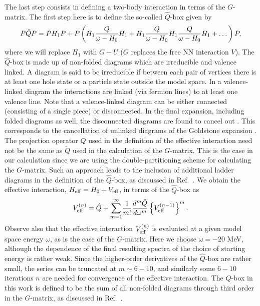 The last step consists in defining a
two-body interaction in terms of the $G$-matrix.
The first step here is to define the so-called $\hat{Q}$-box given by
\begin{equation}
   P\hat{Q}P=PH_1P+
   P\left(H_1 \frac{Q}{\omega-H_{0}}H_1\\ +H_1
   \frac{Q}{\omega-H_{0}}H_1 \frac{Q}{\omega-H_{0}}H_1 +\dots\right)P,
   \label{eq:qbox}
\end{equation}
where we will replace $H_1$ with $G-U$ ($G$ replaces the free NN interaction
$V$).
The $\hat{Q}$-box is made up of non-folded diagrams which are irreducible
and valence linked.
A diagram is said to be irreducible if between each pair
of vertices there is at least one hole state or a particle state outside
the model space. In a valence-linked diagram the interactions are linked
(via fermion lines) to at least one valence line. Note that a valence-linked
diagram can be either connected (consisting of a single piece) or
disconnected. In the final expansion, including folded diagrams as well, the
disconnected diagrams are found to cancel out \cite{ko90}.
This corresponds to the cancellation of unlinked diagrams
of the Goldstone expansion \cite{ko90}.
The projection operator $Q$ used in the definition 
of the effective interaction need not be the same as $\tilde{Q}$
 used in 
the calculation of the $G$-matrix. This is the case in our calculation
since we are using the double-partitioning scheme for calculating the
$G$-matrix. Such an approach leads to the inclusion of additional
ladder diagrams in the definition of the $\hat{Q}$-box, as discussed in
Ref.\ \cite{hko95}.
We obtain the effective interaction,
$H_{\rm{eff}}=H_0+V_{\rm{eff}}$, in terms of the $\hat{Q}$-box as
\cite{hko95,ko90}
\begin{equation}
    V_{\rm{eff}}^{(n)}=\hat{Q}+{\displaystyle\sum_{m=1}^{\infty}}
    \frac{1}{m!}\frac{d^m\hat{Q}}{d\omega^m}\left\{
    V_{\rm{eff}}^{(n-1)}\right\}^m.
    \label{eq:fd}
\end{equation}
Observe also that the
effective interaction $V_{\rm{eff}}^{(n)}$
is evaluated at a given model space energy
$\omega$, as is the case of the $G$-matrix. Here we choose
$\omega =-20$ MeV, although the dependence
of the final resulting spectra of the choice
of starting energy is rather weak. Since the higher-order derivatives of the 
$\hat{Q}$-box are rather small, the series can be truncated 
at $m\sim 6-10$, and similarly some $6-10$ iterations $n$ are 
needed for convergence of the effective interaction. 
The $\hat{Q}$-box in this work is defined to be the sum
of all non-folded diagrams through third order in the $G$-matrix, as
discussed in Ref.\ \cite{hko95}.


